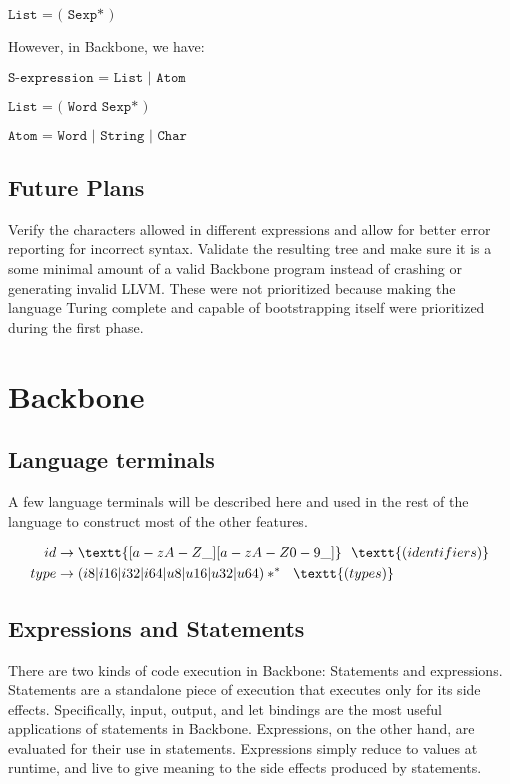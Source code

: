 \documentclass[journal=jacsat, manuscript=article]{achemso}
\begin{document}
$\texttt{List = ( Sexp* )}$

However, in Backbone, we have:

$\texttt{S-expression = List | Atom}$

$\texttt{List = ( Word Sexp* )}$

$\texttt{Atom = Word | String | Char}$

\subsection{Future Plans}

Verify the characters allowed in different expressions and allow for better error reporting for
incorrect syntax. Validate the resulting tree and make sure it is a some minimal amount of
a valid Backbone program instead of crashing or generating invalid LLVM. These were not
prioritized because making the language Turing complete and capable of bootstrapping itself
were prioritized during the first phase.

\section{Backbone}

\subsection{Language terminals}

A few language terminals will be described here and used in the rest of the
language to construct most of the other features.

\begin{align}
    id &\rightarrow \textt{[a-zA-Z\_][a-zA-Z0-9\_]}\,\,\,\,\textt{(identifiers)}\\
    type &\rightarrow (i8|i16|i32|i64|u8|u16|u32|u64)*^*\,\,\,\,\textt{(types)} \\
\end{align}

\subsection{Expressions and Statements}

There are two kinds of code execution in Backbone: Statements and expressions.
Statements are a standalone piece of execution that executes only for its side effects.
Specifically, input, output, and let bindings are the most useful applications of
statements in Backbone. Expressions, on the other hand, are evaluated for their use in 
statements. Expressions simply reduce to values at runtime, and live to give meaning
to the side effects produced by statements.
\end{document}
